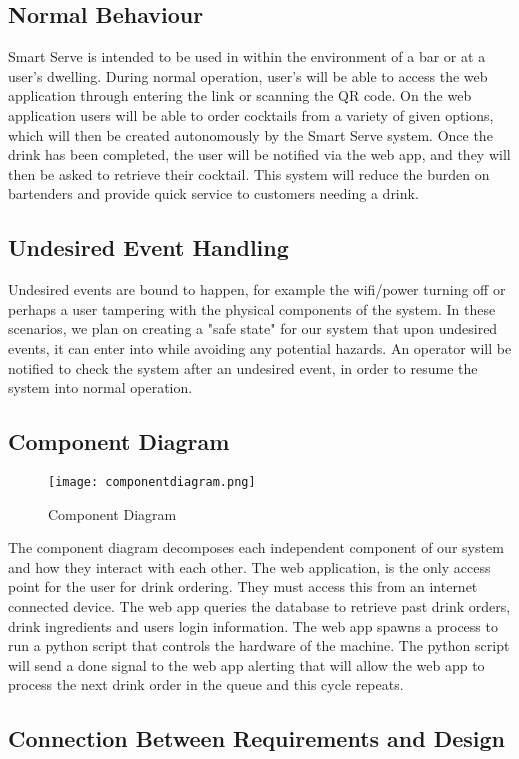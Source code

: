 \documentclass[12pt, titlepage]{article}
\begin{document}
\subsection{Normal Behaviour}
Smart Serve is intended to be used in within the environment of a bar or at a user's dwelling. During normal operation, user's will be able to access the web application through entering the link or scanning the QR code. On the web application users will be able to order cocktails from a variety of given options, which will then be created autonomously by the Smart Serve system. Once the drink has been completed, the user will be notified via the web app, and they will then be asked to retrieve their cocktail. This system will reduce the burden on bartenders and provide quick service to customers needing a drink.

\subsection{Undesired Event Handling}
Undesired events are bound to happen, for example the wifi/power turning off or perhaps a user tampering with the physical components of the system. In these scenarios, we plan on creating a "safe state" for our system that upon undesired events, it can enter into while avoiding any potential hazards. An operator will be notified to check the system after an undesired event, in order to resume the system into normal operation.

\subsection{Component Diagram}
\begin{figure}[H]
    \centerline{\texttt{[image: componentdiagram.png]}}
    \caption{Component Diagram}
    \label{fig}
\end{figure}
The component diagram decomposes each independent component of our system and how they interact with each other. The web application, is the only access point for the user for drink ordering. They must access this from an internet connected device. The web app queries the database to retrieve past drink orders, drink ingredients and users login information. The web app spawns a process to run a python script that controls the hardware of the machine. The python script will send a done signal to the web app alerting that will allow the web app to process the next drink order in the queue and this cycle repeats. 

\subsection{Connection Between Requirements and Design} \label{SecConnection}
\end{document}
